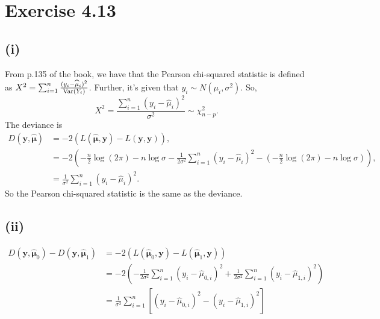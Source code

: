 \section*{Exercise 4.13}
\subsection*{(i)}
From p.135 of the book, we have that the Pearson chi-squared statistic is defined as $X^{2} = \sum_{i=1}^{n} \frac{(y_{i} - \widehat{\mu}_{i})^{2}}{\mathrm{Var}(Y_{i})}$. Further, it's given that $y_{i} \sim N(\mu_{i},\sigma^{2})$. So, $$X^{2} = \frac{\sum_{i=1}^{n}(y_{i} - \widehat{\mu}_{i})^{2}}{\sigma^{2}} \sim \chi_{n-p}^{2}.$$
The deviance is
\begin{align*}
D(\bm{y},\widehat{\bm{\mu}}) &= -2\left(L\left(\widehat{\bm{\mu}},\bm{y}\right) - L\left(\bm{y},\bm{y}\right)\right),\\
&= -2\left(-\frac{n}{2}\log(2\pi) -n\log\sigma - \frac{1}{2\sigma^{2}}\sum_{i=1}^{n}(y_{i} - \widehat{\mu}_{i})^{2} -\left(-\frac{n}{2}\log(2\pi) -n\log\sigma\right)\right),\\
&= \frac{1}{\sigma^{2}}\sum_{i=1}^{n}(y_{i} - \widehat{\mu}_{i})^{2}.
\end{align*}
So the Pearson chi-squared statistic is the same as the deviance.\\

\subsection*{(ii)}
\begin{align*}
D(\bm{y},\widehat{\bm{\mu}}_{0}) - D(\bm{y},\widehat{\bm{\mu}}_{1}) &= -2\left(L\left(\widehat{\bm{\mu}}_{0},\bm{y}\right) - L\left(\widehat{\bm{\mu}}_{1},\bm{y}\right)\right)\\
&= -2\left(-\frac{1}{2\sigma^{2}}\sum_{i=1}^{n}(y_{i} - \widehat{\mu}_{0,i})^{2} +\frac{1}{2\sigma^{2}}\sum_{i=1}^{n}(y_{i} - \widehat{\mu}_{1,i})^{2}\right)\\
&= \frac{1}{\sigma^{2}}\sum_{i=1}^{n}\left[(y_{i} - \widehat{\mu}_{0,i})^{2} -(y_{i} - \widehat{\mu}_{1,i})^{2}\right]\\
\end{align*}
